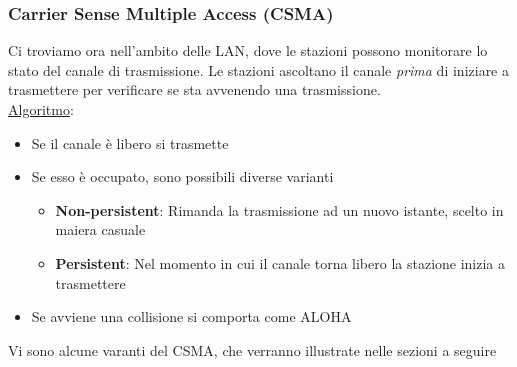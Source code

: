 \documentclass{article}
\begin{document}
            \subsubsection{Carrier Sense Multiple Access (CSMA)}
                Ci troviamo ora nell'ambito delle LAN, dove le stazioni possono monitorare lo stato del canale di trasmissione. Le stazioni ascoltano il canale \textit{prima} di iniziare a trasmettere per verificare se sta avvenendo una trasmissione.\\
                \underline{Algoritmo}:
                \begin{itemize}
                    \item Se il canale è libero si trasmette
                    \item Se esso è occupato, sono possibili diverse varianti
                          \begin{itemize}
                              \item \textbf{Non-persistent}: Rimanda la trasmissione ad un nuovo istante, scelto in maiera casuale
                              \item \textbf{Persistent}: Nel momento in cui il canale torna libero la stazione inizia a trasmettere
                          \end{itemize}
                    \item Se avviene una collisione si comporta come ALOHA
                \end{itemize}

            Vi sono alcune varanti del CSMA, che verranno illustrate nelle sezioni a seguire
            
\end{document}
